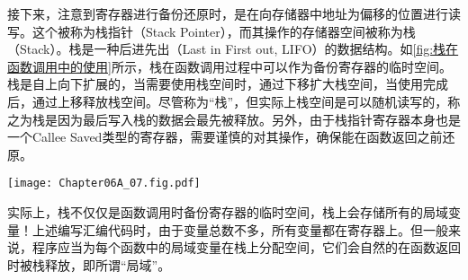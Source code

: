 接下来，注意到寄存器进行备份还原时，是在向存储器中地址为偏移的位置进行读写。这个被称为栈指针（Stack Pointer），而其操作的存储器空间被称为栈（Stack）。栈是一种后进先出（Last in First out, LIFO）的数据结构。如\cref{fig:栈在函数调用中的使用}所示，栈在函数调用过程中可以作为备份寄存器的临时空间。栈是自上向下扩展的，当需要使用栈空间时，通过下移扩大栈空间，当使用完成后，通过上移释放栈空间。尽管称为“栈”，但实际上栈空间是可以随机读写的，称之为栈是因为最后写入栈的数据会最先被释放。另外，由于栈指针寄存器本身也是一个Callee Saved类型的寄存器，需要谨慎的对其操作，确保能在函数返回之前还原。

\begin{Figure}[栈在函数调用中的使用]
    \texttt{[image: Chapter06A\_07.fig.pdf]}
\end{Figure}

实际上，栈不仅仅是函数调用时备份寄存器的临时空间，栈上会存储所有的局域变量！上述编写汇编代码时，由于变量总数不多，所有变量都在寄存器上。但一般来说，程序应当为每个函数中的局域变量在栈上分配空间，它们会自然的在函数返回时被栈释放，即所谓“局域”。
